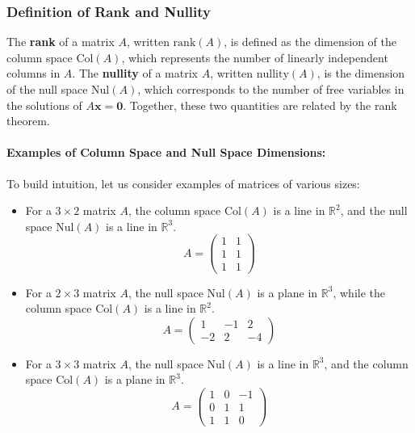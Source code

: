 \documentclass[a4paper,12pt]{article}
\begin{document}
\subsubsection{Definition of Rank and Nullity} 
The \textbf{rank} of a matrix \( A \), written \( \text{rank}(A) \), is defined as the dimension of the column space \( \text{Col}(A) \), which represents the number of linearly independent columns in \( A \). The \textbf{nullity} of a matrix \( A \), written \( \text{nullity}(A) \), is the dimension of the null space \( \text{Nul}(A) \), which corresponds to the number of free variables in the solutions of \( A \mathbf{x} = \mathbf{0} \). Together, these two quantities are related by the rank theorem.

\paragraph{Examples of Column Space and Null Space Dimensions:}
To build intuition, let us consider examples of matrices of various sizes:
\begin{itemize}
    \item For a \( 3 \times 2 \) matrix \( A \), the column space \( \text{Col}(A) \) is a line in \( \mathbb{R}^2 \), and the null space \( \text{Nul}(A) \) is a line in \( \mathbb{R}^3 \).
    \[
    A = \begin{pmatrix}
    1 & 1 \\
    1 & 1 \\
    1 & 1
    \end{pmatrix}
    \]
    \item For a \( 2 \times 3 \) matrix \( A \), the null space \( \text{Nul}(A) \) is a plane in \( \mathbb{R}^3 \), while the column space \( \text{Col}(A) \) is a line in \( \mathbb{R}^2 \).
    \[
    A = \begin{pmatrix}
    1 & -1 & 2 \\
    -2 & 2 & -4
    \end{pmatrix}
    \]
    \item For a \( 3 \times 3 \) matrix \( A \), the null space \( \text{Nul}(A) \) is a line in \( \mathbb{R}^3 \), and the column space \( \text{Col}(A) \) is a plane in \( \mathbb{R}^3 \).
    \[
    A = \begin{pmatrix}
    1 & 0 & -1 \\
    0 & 1 & 1 \\
    1 & 1 & 0
    \end{pmatrix}
    \]
\end{itemize}
\end{document}

